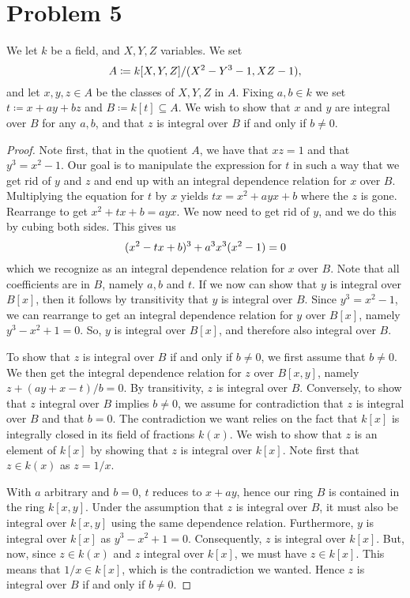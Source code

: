 \documentclass{article}
\begin{document}
\section*{Problem 5}
We let $k$ be a field, and $X, Y, Z$ variables. We set
\begin{equation}
    \notag
    A \coloneqq k[X, Y, Z] / (X^2- Y^3 - 1, XZ - 1), 
\end{equation}
and let $x, y, z \in A$ be the classes of $X, Y, Z$ in $A$. Fixing $a, b \in k$
we set $t \coloneqq x + ay + bz$ and $B \coloneqq k[t] \subseteq A$. We wish to
show that $x$ and $y$ are integral over $B$ for any $a, b$, and that $z$ is
integral over $B$ if and only if $b \neq 0$.

\begin{proof}
    Note first, that in the quotient $A$, we have that $xz = 1$ and that $y^3 = x^2
    - 1$. Our goal is to manipulate the expression for $t$ in such a way that we
    get rid of $y$ and $z$ and end up with an integral dependence relation for $x$
    over $B$. Multiplying the equation for $t$ by $x$ yields $tx = x^2 + ayx + b$
    where the $z$ is gone. Rearrange to get $x^2 + tx + b = ayx$. We now need to
    get rid of $y$, and we do this by cubing both sides. This gives us
    \begin{equation}
        \notag
        (x^2 - tx + b)^3 + a^3x^3(x^2 - 1) = 0
    \end{equation}
    which we recognize as an integral dependence relation for $x$ over $B$. Note
    that all coefficients are in $B$, namely $a, b$ and $t$. If we now can show
    that $y$ is integral over $B[x]$, then it follows by transitivity that $y$ is
    integral over $B$. Since $y^3 = x^2 - 1$, we can rearrange to get an integral
    dependence relation for $y$ over $B[x]$, namely $y^3 - x^2 + 1 = 0$. So, $y$ is
    integral over $B[x]$, and therefore also integral over $B$.

    To show that $z$ is integral over $B$ if and only if $b \neq 0$, we first
    assume that $b\neq 0$. We then get the integral dependence relation for $z$
    over $B[x, y]$, namely $z + (a y + x - t) / b = 0$. By transitivity, $z$ is
    integral over $B$. Conversely, to show that $z$ integral over $B$ implies $b
    \neq 0$, we assume for contradiction that $z$ is integral over $B$ and that $b
    = 0$. The contradiction we want relies on the fact that $k[x]$ is integrally
    closed in its field of fractions $k(x)$. We wish to show that $z$ is an element
    of $k[x]$ by showing that $z$ is integral over $k[x]$. Note first that $z \in
    k(x)$ as $z = 1 / x$. 

    With $a$ arbitrary and $b = 0$, $t$ reduces to $x + ay$, hence our ring $B$ is
    contained in the ring $k[x, y]$. Under the assumption that $z$ is integral over
    $B$, it must also be integral over $k[x, y]$ using the same dependence
    relation. Furthermore, $y$ is integral over $k[x]$ as $y^3 - x^2 + 1 = 0$.
    Consequently, $z$ is integral over $k[x]$. But, now, since $z \in k(x)$ and $z$
    integral over $k[x]$, we must have $z \in k[x]$. This means that $1 / x \in
    k[x]$, which is the contradiction we wanted. Hence $z$ is integral over $B$ if
    and only if $b \neq 0$.
\end{proof}     
\end{document}
